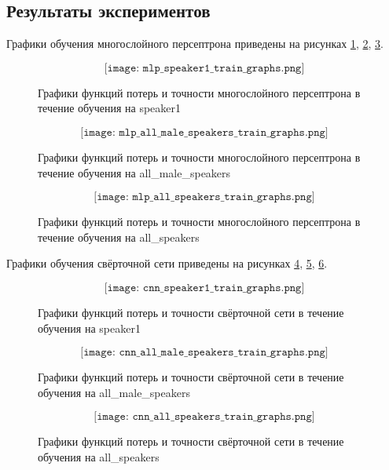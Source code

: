 \subsection{Результаты экспериментов}
Графики обучения многослойного персептрона приведены на рисунках \ref{fig:mlp_speaker1_train_graphs}, \ref{fig:mlp_all_male_speakers_train_graphs}, \ref{fig:mlp_all_speakers_train_graphs}.

\begin{figure}[H]
	\[\texttt{[image: mlp\_speaker1\_train\_graphs.png]}\]
	\caption{Графики функций потерь и точности многослойного персептрона в течение обучения на speaker1}
	\label{fig:mlp_speaker1_train_graphs}
\end{figure}

\begin{figure}[H]
	\[\texttt{[image: mlp\_all\_male\_speakers\_train\_graphs.png]}\]
	\caption{Графики функций потерь и точности многослойного персептрона в течение обучения на all\_male\_speakers}
	\label{fig:mlp_all_male_speakers_train_graphs}
\end{figure}

\begin{figure}[H]
	\[\texttt{[image: mlp\_all\_speakers\_train\_graphs.png]}\]
	\caption{Графики функций потерь и точности многослойного персептрона в течение обучения на all\_speakers}
	\label{fig:mlp_all_speakers_train_graphs}
\end{figure}


Графики обучения свёрточной сети приведены на рисунках \ref{fig:cnn_speaker1_train_graphs}, \ref{fig:cnn_all_male_speakers_train_graphs}, \ref{fig:cnn_all_speakers_train_graphs}.

\begin{figure}[H]
	\[\texttt{[image: cnn\_speaker1\_train\_graphs.png]}\]
	\caption{Графики функций потерь и точности свёрточной сети в течение обучения на speaker1}
	\label{fig:cnn_speaker1_train_graphs}
\end{figure}

\begin{figure}[H]
	\[\texttt{[image: cnn\_all\_male\_speakers\_train\_graphs.png]}\]
	\caption{Графики функций потерь и точности свёрточной сети в течение обучения на all\_male\_speakers}
	\label{fig:cnn_all_male_speakers_train_graphs}
\end{figure}

\begin{figure}[H]
	\[\texttt{[image: cnn\_all\_speakers\_train\_graphs.png]}\]
	\caption{Графики функций потерь и точности свёрточной сети в течение обучения на all\_speakers}
	\label{fig:cnn_all_speakers_train_graphs}
\end{figure}

